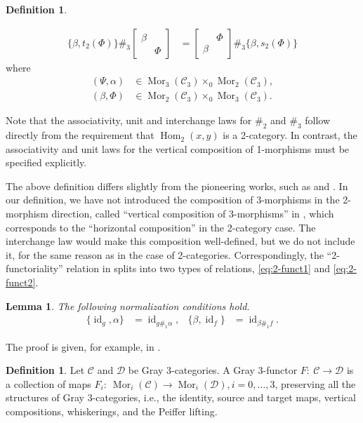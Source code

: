 \documentclass[11pt, reqno]{amsart} %
\newcommand{\mor}{{\mathop{\mathrm{Mor}}}}
\newcommand{\Hom}{{\mathop{\mathrm{Hom}}}}
\newcommand{\id}{{\mathop{\mathrm{id}}}}
\newcommand{\cC}{{\mathcal{C}}}
\newcommand{\cD}{{\mathcal{D}}}
\newtheorem{lemma}[theorem]{Lemma}
\theoremstyle{definition}
\newtheorem{definition}[theorem]{Definition}
\theoremstyle{remark}
\numberwithin{equation}{section}
\begin{document}
\begin{definition}
\begin{enumerate}
\begin{align}
    \label{eq:2-funct2}
    \{\beta,t_2(\Phi)\}\#_3\begin{bmatrix}\beta & \\ & \Phi\end{bmatrix} &= \begin{bmatrix}& \Phi \\ \beta &\end{bmatrix}\#_3\{\beta,s_2(\Phi)\}
  \end{align}
  where
  \begin{align}
    \nonumber
    (\Psi,\alpha) &\in \mor_3(\cC_3)\times_0\mor_2(\cC_3), \\
    \nonumber
    (\beta,\Phi) &\in \mor_2(\cC_3)\times_0\mor_3(\cC_3).
  \end{align}
\end{enumerate}
\end{definition}

Note that the associativity, unit and interchange laws for $\#_2$ and $\#_3$ follow directly from the requirement that $\Hom_2(x,y)$ is a 2-category. In contrast, the associativity and unit laws for the vertical composition of 1-morphisms must be specified explicitly.

The above definition differs slightly from the pioneering works, such as \cite{Martins:2009evc} and \cite{Sarikaya:2024}. In our definition, we have not introduced the composition of 3-morphisms in the 2-morphism direction, called ``vertical composition of 3-morphisms'' in \cite{Martins:2009evc}, which corresponds to the ``horizontal composition'' in the 2-category case. The interchange law would make this composition well-defined, but we do not include it, for the same reason as in the case of 2-categories. Correspondingly, the ``2-functoriality'' relation in \cite{Martins:2009evc} splits into two types of relations, \eqref{eq:2-funct1} and \eqref{eq:2-funct2}.

\begin{lemma}
The following normalization conditions hold.
\begin{align}
  \nonumber
  \{\id_g,\alpha\} &= \id_{g\#_1\alpha}, & \{\beta,\id_f\} &= \id_{\beta\#_1f}.
\end{align}
\end{lemma}
The proof is given, for example, in \cite{Sarikaya:2024}.

\begin{definition}\label{def:Gray3Functor}
Let $\cC$ and $\cD$ be Gray 3-categories. A Gray 3-functor $F:~\cC\to\cD$ is a collection of maps $F_i:~\mor_i(\cC)\to\mor_i(\cD), i=0,\ldots,3$, preserving all the structures of Gray 3-categories, i.e., the identity, source and target maps, vertical compositions, whiskerings, and the Peiffer lifting.
\end{definition}
\end{document}

